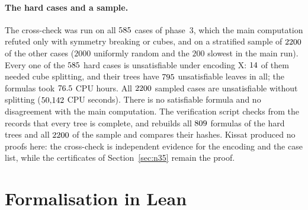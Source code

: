 \documentclass[11pt]{article}
\theoremstyle{definition}
\theoremstyle{remark}
\begin{document}
\paragraph{The hard cases and a sample.} The cross-check was run on all $585$ cases of phase~3,
which the main computation refuted only with symmetry breaking or cubes, and on a stratified sample of
$2200$ of the other cases ($2000$ uniformly random and the $200$ slowest in the main run).
Every one of the $585$ hard cases is unsatisfiable under encoding X: $14$ of them
needed cube splitting, and their trees have $795$ unsatisfiable leaves in all; the formulas took
$76.5$ CPU hours. All $2200$ sampled cases are unsatisfiable without splitting
($50{,}142$ CPU seconds). There is no satisfiable formula and no disagreement with the main
computation. The verification script checks from the records that every tree is complete, and rebuilds
all $809$ formulas of the hard trees and all $2200$ of the sample and compares their
hashes. Kissat produced no proofs here: the cross-check is independent evidence for the encoding and the
case list, while the certificates of Section~\ref{sec:n35} remain the proof.

\section{Formalisation in Lean}\label{sec:lean}
\end{document}
